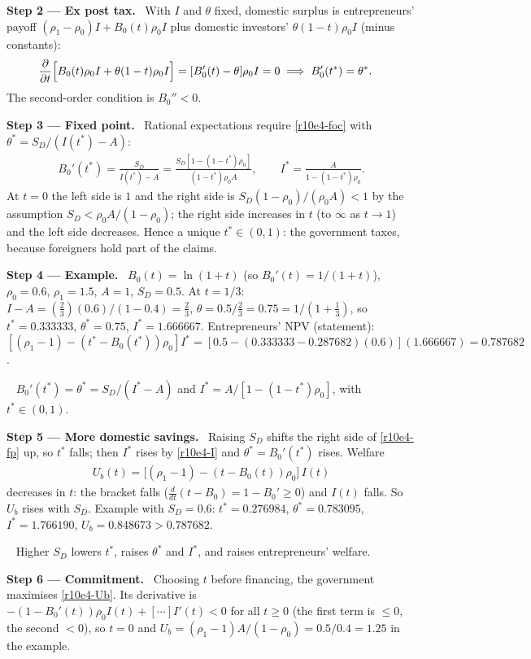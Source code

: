 \documentclass[11pt,a4paper]{article}
\newcommand{\step}[2]{\par\medskip\noindent\textbf{Step #1 --- #2.}~}
\newcommand{\answer}[1]{\par\smallskip\noindent\fbox{\textbf{Answer\if\relax\detokenize{#1}\relax\else\ #1\fi.}}~}
\begin{document}
\step{2}{Ex post tax} With $I$ and $\theta$ fixed, domestic surplus is entrepreneurs' payoff $(\rho_1-\rho_0)I+B_0(t)\rho_0I$ plus domestic investors' $\theta(1-t)\rho_0I$ (minus constants):
\begin{align}
  \frac{\partial}{\partial t}\Bigl[B_0(t)\rho_0I+\theta(1-t)\rho_0I\Bigr] &= [B_0'(t)-\theta]\rho_0I=0 \;\Longrightarrow\; B_0'(t^*)=\theta^*. \label{r10e4-foc}
\end{align}
The second-order condition is $B_0''<0$.

\step{3}{Fixed point} Rational expectations require \eqref{r10e4-foc} with $\theta^*=S_D/(I(t^*)-A)$:
\begin{align}
  B_0'(t^*) = \frac{S_D}{I(t^*)-A} = \frac{S_D[1-(1-t^*)\rho_0]}{(1-t^*)\rho_0A}, \qquad I^*=\frac{A}{1-(1-t^*)\rho_0}. \label{r10e4-fp}
\end{align}
At $t=0$ the left side is $1$ and the right side is $S_D(1-\rho_0)/(\rho_0A)<1$ by the assumption $S_D<\rho_0A/(1-\rho_0)$; the right side increases in $t$ (to $\infty$ as $t\to1$) and the left side decreases. Hence a unique $t^*\in(0,1)$: the government taxes, because foreigners hold part of the claims.

\step{4}{Example} $B_0(t)=\ln(1+t)$ (so $B_0'(t)=1/(1+t)$), $\rho_0=0.6$, $\rho_1=1.5$, $A=1$, $S_D=0.5$. At $t=1/3$: $I-A=(\tfrac23)(0.6)/(1-0.4)=\tfrac23$, $\theta=0.5/\tfrac23=0.75=1/(1+\tfrac13)$, so $t^*=0.333333$, $\theta^*=0.75$, $I^*=1.666667$. Entrepreneurs' NPV (statement): $[(\rho_1-1)-(t^*-B_0(t^*))\rho_0]I^*=[0.5-(0.333333-0.287682)(0.6)](1.666667)=0.787682$.

\answer{(i)} $B_0'(t^*)=\theta^*=S_D/(I^*-A)$ and $I^*=A/[1-(1-t^*)\rho_0]$, with $t^*\in(0,1)$.

\step{5}{More domestic savings} Raising $S_D$ shifts the right side of \eqref{r10e4-fp} up, so $t^*$ falls; then $I^*$ rises by \eqref{r10e4-I} and $\theta^*=B_0'(t^*)$ rises. Welfare
\begin{align}
  U_b(t) = \bigl[(\rho_1-1)-(t-B_0(t))\rho_0\bigr]\,I(t) \label{r10e4-Ub}
\end{align}
decreases in $t$: the bracket falls ($\frac{d}{dt}(t-B_0)=1-B_0'\geq0$) and $I(t)$ falls. So $U_b$ rises with $S_D$. Example with $S_D=0.6$: $t^*=0.276984$, $\theta^*=0.783095$, $I^*=1.766190$, $U_b=0.848673>0.787682$.

\answer{(ii)} Higher $S_D$ lowers $t^*$, raises $\theta^*$ and $I^*$, and raises entrepreneurs' welfare.

\step{6}{Commitment} Choosing $t$ before financing, the government maximises \eqref{r10e4-Ub}. Its derivative is $-(1-B_0'(t))\rho_0I(t)+[\cdots]I'(t)<0$ for all $t\geq0$ (the first term is $\leq0$, the second $<0$), so $t=0$ and $U_b=(\rho_1-1)A/(1-\rho_0)=0.5/0.4=1.25$ in the example.
\end{document}
